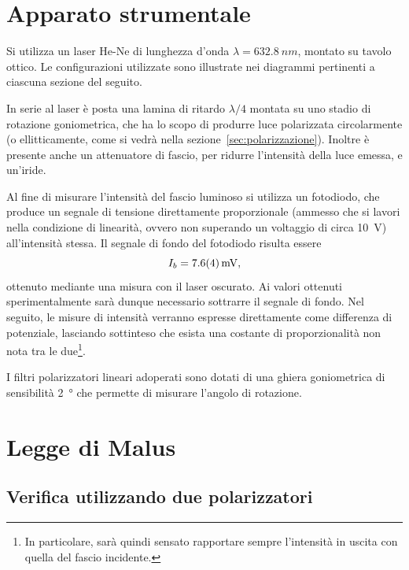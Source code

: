 \documentclass[10pt,oneside,a4paper]{article}
\begin{document}
\begin{multicols}{2}
\section{Apparato strumentale}

Si utilizza un laser He-Ne di lunghezza d'onda $\lambda = \SI{632.8}{nm}$, montato su tavolo ottico. Le configurazioni utilizzate sono illustrate nei diagrammi pertinenti a ciascuna sezione del seguito.

In serie al laser è posta una lamina di ritardo $\lambda / 4$ montata su uno stadio di rotazione goniometrica, che ha lo scopo di produrre luce polarizzata circolarmente (o ellitticamente, come si vedrà nella sezione~\ref{sec:polarizzazione}). Inoltre è presente anche un attenuatore di fascio, per ridurre l'intensità della luce emessa, e un'iride.

Al fine di misurare l'intensità del fascio luminoso si utilizza un fotodiodo, che produce un segnale di tensione direttamente proporzionale (ammesso che si lavori nella condizione di linearità, ovvero non superando un voltaggio di circa \SI{10}{V}) all'intensità stessa. Il segnale di fondo del fotodiodo risulta essere 
\[
I_b = \SI{7.6 \pm 0.4}{mV},
\]
ottenuto mediante una misura con il laser oscurato. Ai valori ottenuti sperimentalmente sarà dunque necessario sottrarre il segnale di fondo. Nel seguito, le misure di intensità verranno espresse direttamente come differenza di potenziale, lasciando sottinteso che esista una costante di proporzionalità non nota tra le due\footnote{In particolare, sarà quindi sensato rapportare sempre l'intensità in uscita con quella del fascio incidente.}.

I filtri polarizzatori lineari adoperati sono dotati di una ghiera goniometrica di sensibilità \SI{2}{\degree} che permette di misurare l'angolo di rotazione.




\section{Legge di Malus}
\subsection{Verifica utilizzando due polarizzatori}


\end{multicols}
\end{document}
